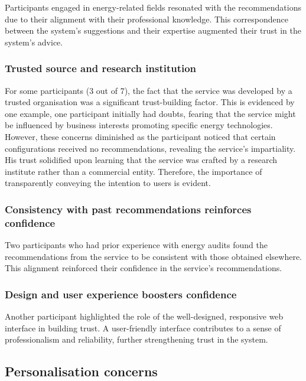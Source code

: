 Participants engaged in energy-related fields resonated with the recommendations due to their alignment with their professional knowledge. 
This correspondence between the system's suggestions and their expertise augmented their trust in the system's advice.


\subsubsection*{Trusted source and research institution}

For some participants (3 out of 7), the fact that the service was developed by a trusted organisation was a significant trust-building factor.
This is evidenced by one example, one participant initially had doubts, fearing that the service might be influenced by business interests promoting specific energy technologies. 
However, these concerns diminished as the participant noticed that certain configurations received no recommendations, revealing the service's impartiality. 
His trust solidified upon learning that the service was crafted by a research institute rather than a commercial entity. 
Therefore, the importance of transparently conveying the intention to users is evident. 


\subsubsection*{Consistency with past recommendations reinforces confidence}

Two participants who had prior experience with energy audits found the recommendations from the service to be consistent with those obtained elsewhere. 
This alignment reinforced their confidence in the service's recommendations.


\subsubsection*{Design and user experience boosters confidence}

Another participant highlighted the role of the well-designed, responsive web interface in building trust. 
A user-friendly interface contributes to a sense of professionalism and reliability, further strengthening trust in the system.


\subsection*{Personalisation concerns}

